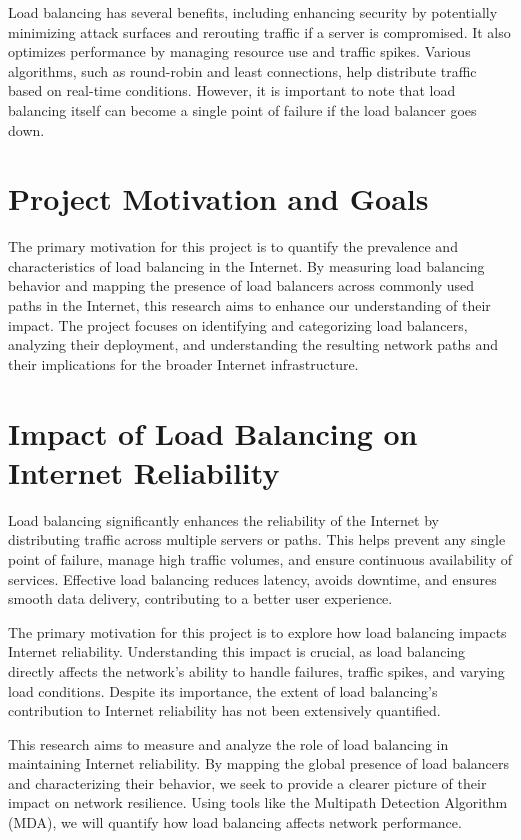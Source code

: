 \documentclass[12pt]{cwru_thesis}
\begin{document}
Load balancing has several benefits, including enhancing security by potentially minimizing attack surfaces and rerouting traffic if a server is compromised. It also optimizes performance by managing resource use and traffic spikes. Various algorithms, such as round-robin and least connections, help distribute traffic based on real-time conditions. However, it is important to note that load balancing itself can become a single point of failure if the load balancer goes down.

\section{Project Motivation and Goals}

The primary motivation for this project is to quantify the prevalence and characteristics of load balancing in the Internet. By measuring load balancing behavior and mapping the presence of load balancers across commonly used paths in the Internet, this research aims to enhance our understanding of their impact. The project focuses on identifying and categorizing load balancers, analyzing their deployment, and understanding the resulting network paths and their implications for the broader Internet infrastructure.

\section{Impact of Load Balancing on Internet Reliability}

Load balancing significantly enhances the reliability of the Internet by distributing traffic across multiple servers or paths. This helps prevent any single point of failure, manage high traffic volumes, and ensure continuous availability of services. Effective load balancing reduces latency, avoids downtime, and ensures smooth data delivery, contributing to a better user experience.

The primary motivation for this project is to explore how load balancing impacts Internet reliability. Understanding this impact is crucial, as load balancing directly affects the network's ability to handle failures, traffic spikes, and varying load conditions. Despite its importance, the extent of load balancing's contribution to Internet reliability has not been extensively quantified.

This research aims to measure and analyze the role of load balancing in maintaining Internet reliability. By mapping the global presence of load balancers and characterizing their behavior, we seek to provide a clearer picture of their impact on network resilience. Using tools like the Multipath Detection Algorithm (MDA), we will quantify how load balancing affects network performance.
\end{document}
